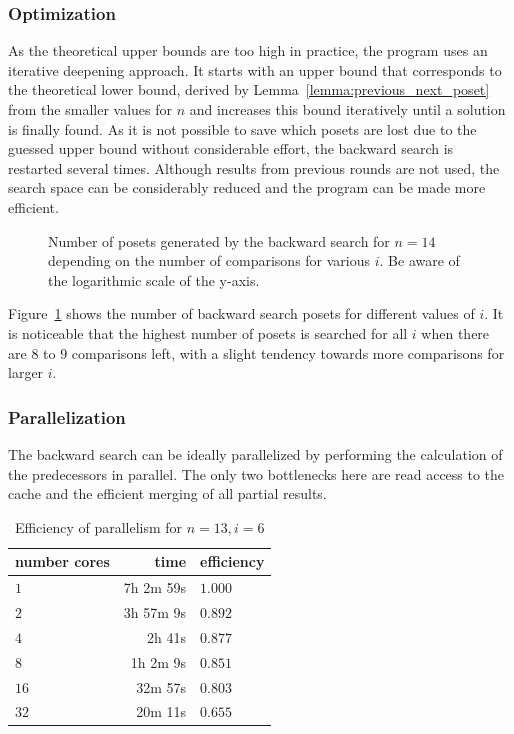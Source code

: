 \documentclass[10pt,journal,compsoc]{IEEEtran}
\begin{document}
\subsubsection{Optimization}

As the theoretical upper bounds are too high in practice, the program uses an iterative deepening approach.
It starts with an upper bound that corresponds to the theoretical lower bound, derived by Lemma~\ref{lemma:previous_next_poset} from the smaller values for $n$ and increases this bound iteratively until a solution is finally found.
As it is not possible to save which posets are lost due to the guessed upper bound without considerable effort, the backward search is restarted several times.
Although results from previous rounds are not used, the search space can be considerably reduced and the program can be made more efficient.

\begin{figure}[!b]
  \centering
  
  \caption{Number of posets generated by the backward search for $n = 14$ depending on the number of comparisons for various $i$. Be aware of the logarithmic scale of the y-axis.}
  \label{fig:backward-posets-per-level}
\end{figure}

Figure~\ref{fig:backward-posets-per-level} shows the number of backward search posets for different values of $i$.
It is noticeable that the highest number of posets is searched for all $i$ when there are $8$ to $9$ comparisons left, with a slight tendency towards more comparisons for larger $i$.


\subsubsection{Parallelization} \label{sec:backward:parallelisation}

The backward search can be ideally parallelized by performing the calculation of the predecessors in parallel.
The only two bottlenecks here are read access to the cache and the efficient merging of all partial results.

\begin{table}[!t]
  \renewcommand{\arraystretch}{1.2}
  \caption{Efficiency of parallelism for $n = 13, i = 6$}
  \label{table:backward-parallel}
  \centering
  \begin{tabular}{l|r|l}
    number cores & time      & efficiency \\
    \hline
    $1$          & 7h 2m 59s & $1.000$    \\
    $2$          & 3h 57m 9s & $0.892$    \\
    $4$          & 2h 41s    & $0.877$    \\
    $8$          & 1h 2m 9s  & $0.851$    \\
    $16$         & 32m 57s   & $0.803$    \\
    $32$         & 20m 11s   & $0.655$    \\ %
  \end{tabular}
\end{table}
\end{document}

